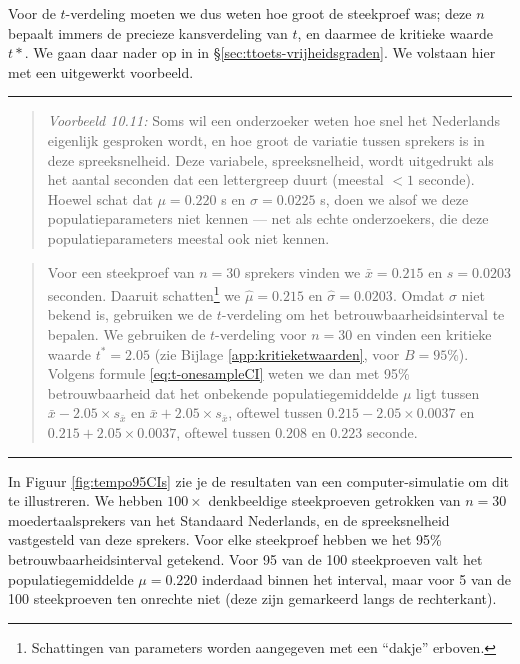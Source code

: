 \documentclass[
]{book}
\begin{document}
Voor de \(t\)-verdeling moeten we dus weten hoe groot de steekproef was;
deze \(n\) bepaalt immers de precieze kansverdeling van \(t\), en daarmee de
kritieke waarde \(t*\). We gaan daar nader op in in
§\ref{sec:ttoets-vrijheidsgraden}. We volstaan hier met een
uitgewerkt voorbeeld.

\begin{center}\rule{0.5\linewidth}{0.5pt}\end{center}

\begin{quote}
\emph{Voorbeeld 10.11:}
Soms wil een onderzoeker weten hoe snel het Nederlands eigenlijk
gesproken wordt, en hoe groot de variatie tussen sprekers is in deze
spreeksnelheid. Deze variabele, spreeksnelheid, wordt uitgedrukt als het
aantal seconden dat een lettergreep duurt (meestal \(<1\) seconde). Hoewel \citep{Quene08}
schat dat \(\mu=0.220\) s en \(\sigma=0.0225\) s, doen we alsof we deze
populatieparameters niet kennen --- net als echte onderzoekers, die deze
populatieparameters meestal ook niet kennen.
\end{quote}

\begin{quote}
Voor een steekproef van \(n=30\) sprekers vinden we \(\bar{x}=0.215\) en
\(s=0.0203\) seconden. Daaruit schatten\footnote{Schattingen van parameters worden aangegeven met een ``dakje'' erboven.} we \(\hat{\mu}=0.215\) en
\(\hat{\sigma}=0.0203\). Omdat \(\sigma\) niet bekend is, gebruiken we de
\(t\)-verdeling om het betrouwbaarheidsinterval te bepalen. We gebruiken
de \(t\)-verdeling voor \(n=30\) en vinden een kritieke waarde \(t^*=2.05\)
(zie
Bijlage \ref{app:kritieketwaarden}, voor \(B=95\)\%).
Volgens
formule \eqref{eq:t-onesampleCI} weten we dan met 95\% betrouwbaarheid dat het onbekende populatiegemiddelde \(\mu\) ligt tussen
\(\bar{x}-2.05\times s_{\bar{x}}\) en \(\bar{x}+2.05\times s_{\bar{x}}\),
oftewel tussen \(0.215-2.05\times0.0037\) en \(0.215+2.05\times0.0037\),
oftewel tussen \(0.208\) en \(0.223\) seconde.
\end{quote}

\begin{center}\rule{0.5\linewidth}{0.5pt}\end{center}

In Figuur \ref{fig:tempo95CIs} zie je de resultaten van een
computer-simulatie om dit te illustreren. We hebben \(100\times\)
denkbeeldige steekproeven getrokken van \(n=30\) moedertaalsprekers van
het Standaard Nederlands, en de spreeksnelheid vastgesteld van deze
sprekers. Voor elke steekproef hebben we het 95\%
betrouwbaarheidsinterval getekend. Voor 95 van de 100 steekproeven valt
het populatiegemiddelde \(\mu=0.220\) inderdaad binnen het interval, maar
voor 5 van de 100 steekproeven ten onrechte niet (deze zijn gemarkeerd
langs de rechterkant).
\end{document}
